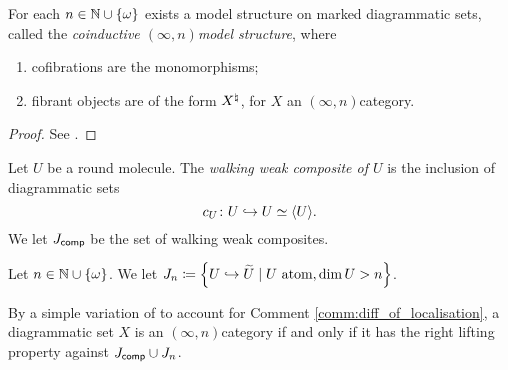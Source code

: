 \begin{prop} \label{prop:model_structre_on_marked_dgm_set}
    For each \( n \in \mathbb{N} \cup \left\{ {\omega} \right\} \) exists a model structure on marked diagrammatic sets, called the \emph{coinductive \( (\infty, n) \)\nbd model structure}, where
    \begin{enumerate}
        \item cofibrations are the monomorphisms;
        \item fibrant objects are of the form \( {X}^{\natural} \), for \( X \) an \( (\infty, n) \)\nbd category.
    \end{enumerate}
\end{prop}
\begin{proof}
    See \cite[3.24, Theorem 4.9]{chanavat2024model}.
\end{proof}

\begin{dfn}
    Let \( U \) be a round molecule.
    The \emph{walking weak composite of \( U \)} is the inclusion of diagrammatic sets
    \begin{equation*}
        c_U \colon U \hookrightarrow U \simeq \langle U\rangle.
    \end{equation*}
    We let \( J_{\mathsf{comp}} \) be the set of walking weak composites.
\end{dfn}

\begin{dfn}
    Let \( n \in \mathbb{N} \cup \left\{ {\omega} \right\} \).
    We let \( J_{n} \coloneqq \left\{ {U \hookrightarrow \widetilde{U} \mid U \text{ atom}, \dim U > n } \right\} \).
\end{dfn}

\begin{rmk} \label{rmk:infty_n_cat_iff_rlp_Jcomp_Jn}
    By a simple variation of \cite[Proposition 3.8, Proposition 3.9]{chanavat2024model} to account for Comment \ref{comm:diff_of_localisation}, a diagrammatic set \( X \) is an \( (\infty, n) \)\nbd category if and only if it has the right lifting property against \( J_{\mathsf{comp}} \cup J_{n} \).
\end{rmk}

